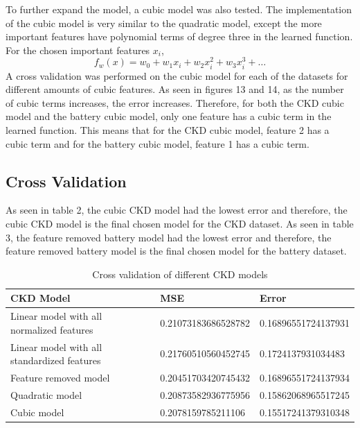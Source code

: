 \documentclass{article}
\begin{document}
To further expand the model, a cubic model was also tested.   The implementation of the cubic model is very similar to the quadratic model, except the more important features have polynomial terms of degree three in the learned function.  For the chosen important features $x_i$,
\begin{equation}
  f_w (x) = w_0 + w_1 x_i + w_2 x^2_i + w_3 x^3_i + \dots
\end{equation}
A cross validation was performed on the cubic model for each of the datasets for different amounts of cubic features.  
As seen in figures 13 and 14, as the number of cubic terms increases, the error increases.  Therefore, for both the CKD cubic model and the battery cubic model, only one feature has a cubic term in the learned function.  
This means that for the CKD cubic model, feature 2 has a cubic term and for the battery cubic model, feature 1 has a cubic term. 

\subsection{Cross Validation}

As seen in table 2, the cubic CKD model had the lowest error and therefore, the cubic CKD model is the final chosen model for the CKD dataset.  As seen in table 3, the feature removed battery model had the lowest error and therefore, the feature removed battery model is the final chosen model for the battery dataset. 

\begin{table}[h!]
  \centering
  \caption{Cross validation of different CKD models}
  \begin{tabular}{|l|l|l|}
  \hline
  \textbf{CKD Model}                               & \textbf{MSE}                  & \textbf{Error}               \\ \hline
  Linear model with all normalized features        & 0.21073183686528782           & 0.16896551724137931          \\ \hline
  Linear model with all standardized features      & 0.21760510560452745           & 0.1724137931034483           \\ \hline
  Feature removed model                            & 0.20451703420745432           & 0.16896551724137934          \\ \hline
  Quadratic model                                  & 0.20873582936775956           & 0.15862068965517245          \\ \hline
  Cubic model                                      & 0.2078159785211106            & 0.15517241379310348          \\ \hline
  \end{tabular}
\end{table}
\end{document}
